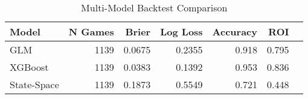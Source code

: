 \begin{table}[htbp]
\centering
\caption{Multi-Model Backtest Comparison}
\label{tab:multimodel}
\begin{tabular}{lrrrrrr}
\toprule
 \textbf{Model} & \textbf{N Games} & \textbf{Brier} & \textbf{Log Loss} & \textbf{Accuracy} & \textbf{ROI} \\
\midrule
GLM & 1139 & 0.0675 & 0.2355 & 0.918 & 0.795 \\
XGBoost & 1139 & 0.0383 & 0.1392 & 0.953 & 0.836 \\
State-Space & 1139 & 0.1873 & 0.5549 & 0.721 & 0.448 \\
\bottomrule
\end{tabular}
\end{table}
